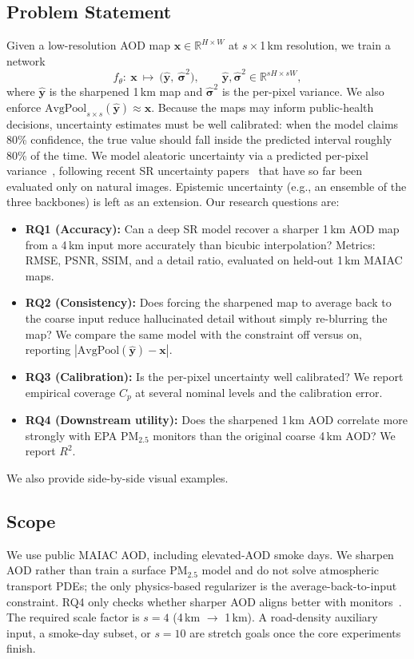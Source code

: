 \documentclass[conference]{IEEEtran}
\begin{document}
\subsection{Problem Statement}
Given a low-resolution AOD map \(\mathbf{x}\in\mathbb{R}^{H\times W}\) at \(s\times\)1\,km resolution, we train a network
\begin{equation}
f_\theta:\ \mathbf{x}\ \mapsto\ \big(\hat{\mathbf{y}},\ \hat{\boldsymbol{\sigma}}^2\big),\qquad \hat{\mathbf{y}},\hat{\boldsymbol{\sigma}}^2\in\mathbb{R}^{sH\times sW},
\end{equation}
where \(\hat{\mathbf{y}}\) is the sharpened 1\,km map and \(\hat{\boldsymbol{\sigma}}^2\) is the per-pixel variance. We also enforce \(\mathrm{AvgPool}_{s\times s}(\hat{\mathbf{y}}) \approx \mathbf{x}\). Because the maps may inform public-health decisions, uncertainty estimates must be well calibrated: when the model claims 80\% confidence, the true value should fall inside the predicted interval roughly 80\% of the time. We model aleatoric uncertainty via a predicted per-pixel variance~\cite{kendall2017uncertainties}, following recent SR uncertainty papers~\cite{he2025buff,zhang2025upsr,csillag2024trust} that have so far been evaluated only on natural images. Epistemic uncertainty (e.g., an ensemble of the three backbones) is left as an extension. Our research questions are:
\begin{itemize}
\item \textbf{RQ1 (Accuracy):} Can a deep SR model recover a sharper 1\,km AOD map from a 4\,km input more accurately than bicubic interpolation? Metrics: RMSE, PSNR, SSIM, and a detail ratio, evaluated on held-out 1\,km MAIAC maps.
\item \textbf{RQ2 (Consistency):} Does forcing the sharpened map to average back to the coarse input reduce hallucinated detail without simply re-blurring the map? We compare the same model with the constraint off versus on, reporting \(|\mathrm{AvgPool}(\hat{\mathbf{y}})-\mathbf{x}|\).
\item \textbf{RQ3 (Calibration):} Is the per-pixel uncertainty well calibrated? We report empirical coverage \(C_p\) at several nominal levels and the calibration error.
\item \textbf{RQ4 (Downstream utility):} Does the sharpened 1\,km AOD correlate more strongly with EPA PM$_{2.5}$ monitors than the original coarse 4\,km AOD? We report \(R^2\).
\end{itemize}
We also provide side-by-side visual examples.
\subsection{Scope}
We use public MAIAC AOD, including elevated-AOD smoke days. We sharpen AOD rather than train a surface PM$_{2.5}$ model and do not solve atmospheric transport PDEs; the only physics-based regularizer is the average-back-to-input constraint. RQ4 only checks whether sharper AOD aligns better with monitors~\cite{di2019ensemble}. The required scale factor is \(s{=}4\) (4\,km \(\to\) 1\,km). A road-density auxiliary input, a smoke-day subset, or \(s{=}10\) are stretch goals once the core experiments finish.
\end{document}
